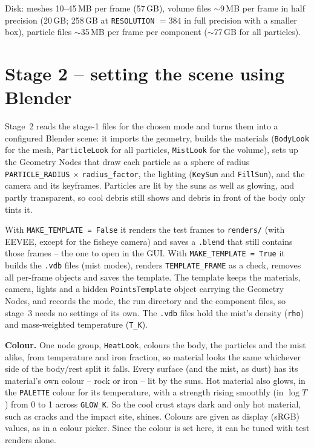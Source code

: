 \documentclass[11pt]{article}
\newcommand{\pc}[1]{\texttt{#1}}
\begin{document}
Disk: meshes 10--45\,MB per frame (57\,GB), volume files $\sim$9\,MB per frame in half precision (20\,GB; 258\,GB at \pc{RESOLUTION} $=384$ in full precision with a smaller box), particle files $\sim$35\,MB per frame per component ($\sim$77\,GB for all particles).
 
\section{Stage 2 -- setting the scene using Blender}
Stage~2 reads the stage-1 files for the chosen mode and turns them into a configured Blender scene: it imports the geometry, builds the materials (\pc{BodyLook} for the mesh, \pc{ParticleLook} for all particles, \pc{MistLook} for the volume), sets up the Geometry Nodes that draw each particle as a sphere of radius \pc{PARTICLE\_RADIUS} $\times$ \pc{radius\_factor}, the lighting (\pc{KeySun} and \pc{FillSun}), and the camera and its keyframes. Particles are lit by the suns as well as glowing, and partly transparent, so cool debris still shows and debris in front of the body only tints it.
 
With \pc{MAKE\_TEMPLATE = False} it renders the test frames to \pc{renders/} (with EEVEE, except for the fisheye camera) and saves a \pc{.blend} that still contains those frames -- the one to open in the GUI. With \pc{MAKE\_TEMPLATE = True} it builds the \pc{.vdb} files (mist modes), renders \pc{TEMPLATE\_FRAME} as a check, removes all per-frame objects and saves the template. The template keeps the materials, camera, lights and a hidden \pc{PointsTemplate} object carrying the Geometry Nodes, and records the mode, the run directory and the component files, so stage~3 needs no settings of its own. The \pc{.vdb} files hold the mist's density (\pc{rho}) and mass-weighted temperature (\pc{T\_K}).
 
\textbf{Colour.}\label{sec:colour} One node group, \pc{HeatLook}, colours the body, the particles and the mist alike, from temperature and iron fraction, so material looks the same whichever side of the body/rest split it falls. Every surface (and the mist, as dust) has its material's own colour -- rock or iron -- lit by the suns. Hot material also glows, in the \pc{PALETTE} colour for its temperature, with a strength rising smoothly (in $\log T$) from 0 to 1 across \pc{GLOW\_K}. So the cool crust stays dark and only hot material, such as cracks and the impact site, shines. Colours are given as display (sRGB) values, as in a colour picker. Since the colour is set here, it can be tuned with test renders alone.
 
\end{document}
